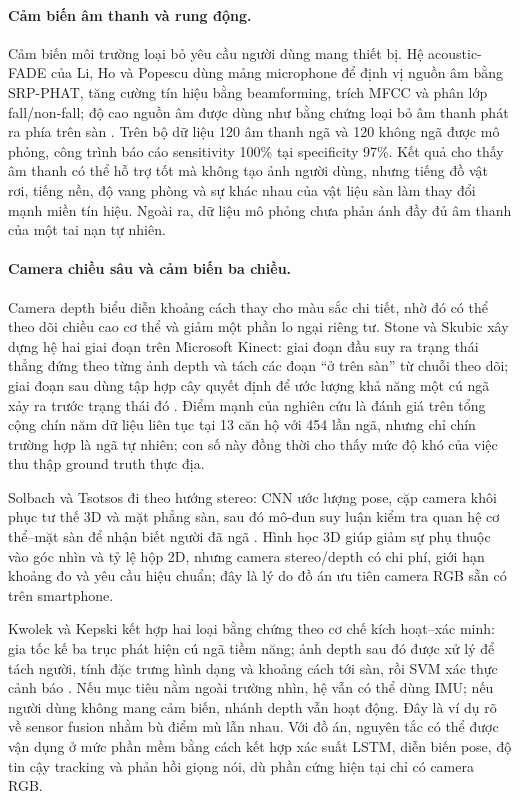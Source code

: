 \paragraph{Cảm biến âm thanh và rung động.}
Cảm biến môi trường loại bỏ yêu cầu người dùng mang thiết bị. Hệ acoustic-FADE của Li, Ho và Popescu dùng mảng microphone để định vị nguồn âm bằng SRP-PHAT, tăng cường tín hiệu bằng beamforming, trích MFCC và phân lớp fall/non-fall; độ cao nguồn âm được dùng như bằng chứng loại bỏ âm thanh phát ra phía trên sàn . Trên bộ dữ liệu 120 âm thanh ngã và 120 không ngã được mô phỏng, công trình báo cáo sensitivity 100\% tại specificity 97\%. Kết quả cho thấy âm thanh có thể hỗ trợ tốt mà không tạo ảnh người dùng, nhưng tiếng đồ vật rơi, tiếng nền, độ vang phòng và sự khác nhau của vật liệu sàn làm thay đổi mạnh miền tín hiệu. Ngoài ra, dữ liệu mô phỏng chưa phản ánh đầy đủ âm thanh của một tai nạn tự nhiên.

\paragraph{Camera chiều sâu và cảm biến ba chiều.}
Camera depth biểu diễn khoảng cách thay cho màu sắc chi tiết, nhờ đó có thể theo dõi chiều cao cơ thể và giảm một phần lo ngại riêng tư. Stone và Skubic xây dựng hệ hai giai đoạn trên Microsoft Kinect: giai đoạn đầu suy ra trạng thái thẳng đứng theo từng ảnh depth và tách các đoạn ``ở trên sàn'' từ chuỗi theo dõi; giai đoạn sau dùng tập hợp cây quyết định để ước lượng khả năng một cú ngã xảy ra trước trạng thái đó . Điểm mạnh của nghiên cứu là đánh giá trên tổng cộng chín năm dữ liệu liên tục tại 13 căn hộ với 454 lần ngã, nhưng chỉ chín trường hợp là ngã tự nhiên; con số này đồng thời cho thấy mức độ khó của việc thu thập ground truth thực địa.

Solbach và Tsotsos đi theo hướng stereo: CNN ước lượng pose, cặp camera khôi phục tư thế 3D và mặt phẳng sàn, sau đó mô-đun suy luận kiểm tra quan hệ cơ thể--mặt sàn để nhận biết người đã ngã . Hình học 3D giúp giảm sự phụ thuộc vào góc nhìn và tỷ lệ hộp 2D, nhưng camera stereo/depth có chi phí, giới hạn khoảng đo và yêu cầu hiệu chuẩn; đây là lý do đồ án ưu tiên camera RGB sẵn có trên smartphone.

Kwolek và Kepski kết hợp hai loại bằng chứng theo cơ chế kích hoạt--xác minh: gia tốc kế ba trục phát hiện cú ngã tiềm năng; ảnh depth sau đó được xử lý để tách người, tính đặc trưng hình dạng và khoảng cách tới sàn, rồi SVM xác thực cảnh báo . Nếu mục tiêu nằm ngoài trường nhìn, hệ vẫn có thể dùng IMU; nếu người dùng không mang cảm biến, nhánh depth vẫn hoạt động. Đây là ví dụ rõ về sensor fusion nhằm bù điểm mù lẫn nhau. Với đồ án, nguyên tắc có thể được vận dụng ở mức phần mềm bằng cách kết hợp xác suất LSTM, diễn biến pose, độ tin cậy tracking và phản hồi giọng nói, dù phần cứng hiện tại chỉ có camera RGB.

